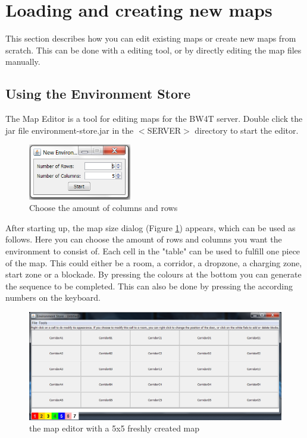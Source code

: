 \newpage

\section{Loading and creating new maps}
This section describes how you can edit existing maps or create new maps from scratch. This can be done with a editing tool, or by directly editing the map files manually.




\subsection{Using the Environment Store}
The Map Editor is a tool for editing maps for the BW4T server. Double click the jar file environment-store.jar  in the $<$SERVER$>$ directory to start the  editor.

\begin{figure}
  \begin{center}
    \includegraphics[width=0.4\textwidth]{EnvironmentStore/SizeDialog.png}
  \end{center}
  \caption{Choose the amount of columns and rows}\label{fig:MapSize}
\end{figure}


After starting up, the map size dialog (Figure \ref{fig:MapSize}) appears, which can be used as follows.
Here you can choose the amount of rows and columns you want the environment to consist of. Each cell in the "table" can be used to fulfill one piece of the map. This could either be a room, a corridor, a dropzone, a charging zone, start zone or a blockade. By pressing the colours at the bottom you can generate the sequence to be completed. This can also be done by pressing the according numbers on the keyboard. 

\begin{figure}
	\center
	\includegraphics[scale=0.55]{EnvironmentStore/MapEditor.png}
	\caption{the map editor with a 5x5 freshly created map}\label{fig:MapEditor}
\end{figure}

